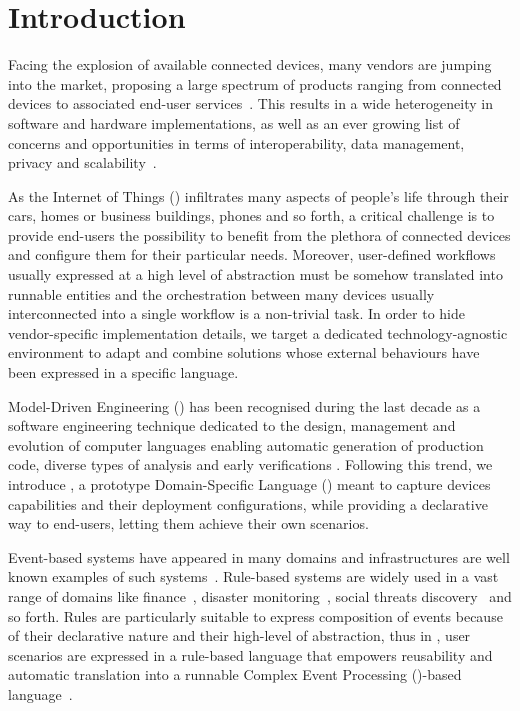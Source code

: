 \section{Introduction}
\label{sec:Introduction}

Facing the explosion of available connected devices, many vendors are jumping into the market, proposing a large spectrum of products ranging from connected devices to associated end-user services~\cite{lee-15}. This results in a wide heterogeneity in software and hardware implementations, as well as an ever growing list of concerns and opportunities in terms of interoperability, data management, privacy and scalability~\cite{chaqfeh-12}.

As the Internet of Things (\IOT) infiltrates many aspects of people's life through their cars, homes or business buildings, phones and so forth, a critical challenge is to provide end-users the possibility to benefit from the plethora of connected devices and configure them for their particular needs. Moreover, user-defined workflows usually expressed at a high level of abstraction must be somehow translated into runnable entities and the orchestration between many devices usually interconnected into a single workflow is a non-trivial task. In order to hide vendor-specific implementation details, we target a dedicated technology-agnostic environment to adapt and combine \IOT solutions whose external behaviours have been expressed in a specific language.

Model-Driven Engineering (\MDE) has been recognised during the last decade as a software engineering technique dedicated to the design, management and evolution of computer languages enabling automatic generation of production code, diverse types of analysis and early verifications \cite{}. Following this trend, we introduce \IOTDSL, a prototype Domain-Specific Language (\DSL) meant to capture \IOT devices capabilities and their deployment configurations, while providing a declarative way to end-users, letting them achieve their own scenarios. 

Event-based systems have appeared in many domains and \IOT infrastructures are well known examples of such systems~\cite{muhl-06,cristea-11}. Rule-based systems are widely used in a vast range of domains like finance~\cite{schultz-09}, disaster monitoring~\cite{broda-09}, social threats discovery~\cite{baran-13} and so forth. Rules are particularly suitable to express composition of events because of their declarative nature and their high-level of abstraction, thus in \IOTDSL, user scenarios are expressed in a rule-based language that empowers reusability and automatic translation into a runnable Complex Event Processing (\CEP)-based language~\cite{cugola-12}.

